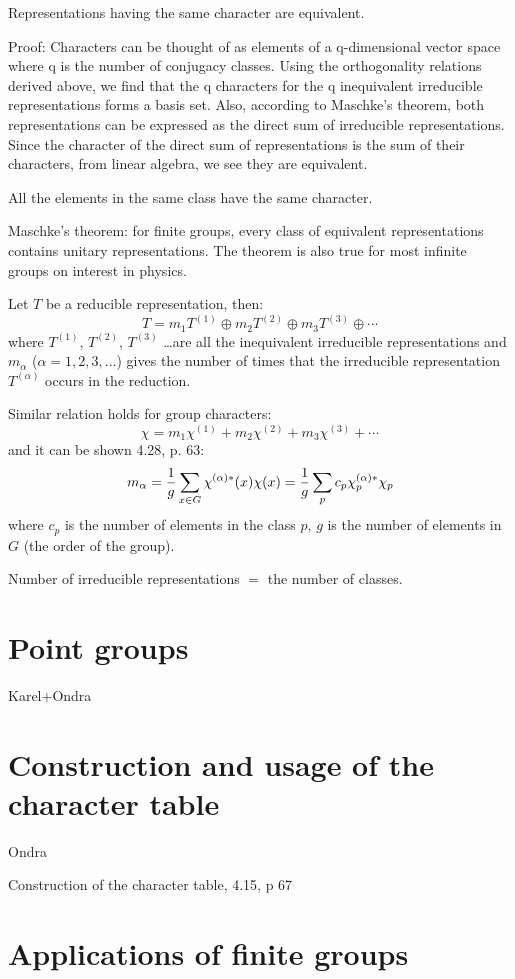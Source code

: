 Representations having the same character are equivalent.

Proof: Characters can be thought of as elements of a q-dimensional vector space
where q is the number of conjugacy classes. Using the orthogonality relations
derived above, we find that the q characters for the q inequivalent irreducible
representations forms a basis set. Also, according to Maschke's theorem, both
representations can be expressed as the direct sum of irreducible
representations. Since the character of the direct sum of representations is
the sum of their characters, from linear algebra, we see they are equivalent.

All the elements in the same class have the same character.

Maschke's theorem: for finite groups, every class of equivalent representations
contains unitary representations. The theorem is also true for most infinite
groups on interest in physics.

Let $T$ be a reducible representation, then:
$$T=m_1T^{(1)} \oplus m_2T^{(2)} \oplus m_3T^{(3)}\oplus \cdots$$
where $T^{(1)}$, $T^{(2)}$, $T^{(3)}$ \dots are all the inequivalent irreducible
representations and $m_\alpha$ ($\alpha=1,2,3,\dots$) gives the number of times
that the irreducible representation $T^{(\alpha)}$ occurs in the reduction.

Similar relation holds for group characters:
$$\chi=m_1\chi^{(1)} + m_2\chi^{(2)} + m_3\chi^{(3)} + \cdots$$
and it can be shown 4.28, p. 63:
$$m_\alpha={1\over g}\sum_{x\in G} \chi^{(\alpha)*}(x)\chi(x)=
{1\over g}\sum_{p} c_p\chi^{(\alpha)*}_p\chi_p$$
where $c_p$ is the number of elements in the class $p$, $g$ is the number of
elements in $G$ (the order of the group).

Number of irreducible representations $=$ the number of classes.


\section{Point groups}

Karel+Ondra

\section{Construction and usage of the character table}

Ondra

Construction of the character table, 4.15, p 67

\section{Applications of finite groups}


